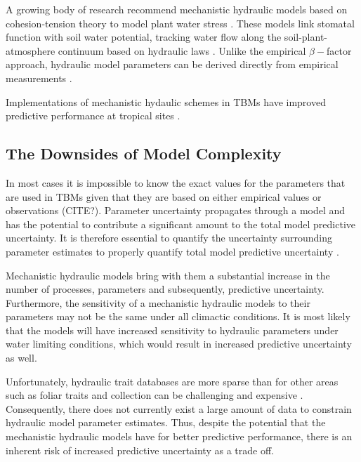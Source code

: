 A growing body of research recommend mechanistic hydraulic models based on cohesion-tension theory to model plant water stress \citep{rogers_2017,fisher_2018}. These models link stomatal function with soil water potential, tracking water flow along the soil-plant-atmosphere continuum based on hydraulic laws \citep{sperry_2015, williams_1996}. Unlike the empirical $\beta-$factor approach, hydraulic model parameters can be derived directly from empirical measurements \citep{choat_2018}.


Implementations of mechanistic hydaulic schemes in TBMs have improved predictive performance at tropical sites \citep{xu_2016, powell_2018, longo_2019, fisher_2007, fauset_2019, choat_2018} .


\subsection*{The Downsides of Model Complexity}

In most cases it is impossible to know the exact values for the  parameters that are used in TBMs given that they are based on either empirical values or observations (CITE?). Parameter uncertainty propagates through a model and has the potential to contribute a significant amount to the total model predictive uncertainty. It is therefore essential to quantify the uncertainty surrounding parameter estimates to properly quantify total model predictive uncertainty \citep{dietze_2017, dietze_2017a}. 

Mechanistic hydraulic models bring with them a substantial increase in the number of processes, parameters and subsequently, predictive uncertainty. Furthermore, the sensitivity of a mechanistic hydraulic models to their parameters may not be the same under all climactic conditions. It is most likely that the models will have increased sensitivity to hydraulic parameters under water limiting conditions, which would result in increased predictive uncertainty as well.

Unfortunately, hydraulic trait databases are more sparse than for other areas such as foliar traits and collection can be challenging and expensive \citep{choat_2018}. Consequently, there does not currently exist a large amount of data to constrain hydraulic model parameter estimates. Thus, despite the potential that the mechanistic hydraulic models have for better predictive performance, there is an inherent risk of increased predictive uncertainty as a trade off.